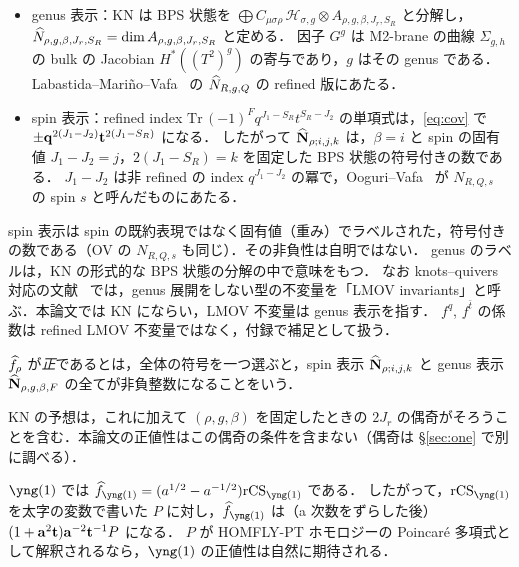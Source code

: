 \begin{itemize}
\item genus 表示：KN は BPS 状態を $\bigoplus C_{\mu\sigma\rho}\,\mathcal{H}_{\sigma,g}\otimes A_{\rho,g,\beta,J_r,S_R}$ と分解し，$\widehat N_{\rho,g,\beta,J_r,S_R}=\dim A_{\rho,g,\beta,J_r,S_R}$ と定める．
因子 $G^g$ は M2-brane の曲線 $\Sigma_{g,h}$ の bulk の Jacobian $H^*((T^2)^g)$ の寄与であり，$g$ はその genus である．
Labastida--Mariño--Vafa~\cite{Labastida01} の $\widehat N_{R,g,Q}$ の refined 版にあたる．
\item spin 表示：refined index $\mathrm{Tr}\,(-1)^Fq^{J_1-S_R}t^{S_R-J_2}$ の単項式は，\eqref{eq:cov} で $\pm\mathbf{q}^{2(J_1-J_2)}\mathbf{t}^{2(J_1-S_R)}$ になる．
したがって $\widehat{\mathbf N}_{\rho;i,j,k}$ は，$\beta=i$ と spin の固有値 $J_1-J_2=j$，$2(J_1-S_R)=k$ を固定した BPS 状態の符号付きの数である．
$J_1-J_2$ は非 refined の index $q^{J_1-J_2}$ の冪で，Ooguri--Vafa~\cite{Ooguri99} が $N_{R,Q,s}$ の spin $s$ と呼んだものにあたる．
\end{itemize}
spin 表示は spin の既約表現ではなく固有値（重み）でラベルされた，符号付きの数である（OV の $N_{R,Q,s}$ も同じ）．その非負性は自明ではない．
genus のラベルは，KN の形式的な BPS 状態の分解の中で意味をもつ．
なお knots--quivers 対応の文献~\cite{Ekholm18} では，genus 展開をしない型の不変量を「LMOV invariants」と呼ぶ．本論文では KN にならい，LMOV 不変量は genus 表示を指す．
$f^q$, $f^{\bar t}$ の係数は refined LMOV 不変量ではなく，付録で補足として扱う．

\begin{definition}[正値性]\label{def:positivity}
$\widehat f_\rho$ が\emph{正}であるとは，全体の符号を一つ選ぶと，spin 表示 $\widehat{\mathbf N}_{\rho;i,j,k}$ と genus 表示 $\widehat{\mathbf N}_{\rho,g,\beta,F}$ の全てが非負整数になることをいう．
\end{definition}
KN の予想は，これに加えて $(\rho,g,\beta)$ を固定したときの $2J_r$ の偶奇がそろうことを含む．本論文の正値性はこの偶奇の条件を含まない（偶奇は \S\ref{sec:one} で別に調べる）．

$\yng(1)$ では $\hf_{\yng(1)}=(a^{1/2}-a^{-1/2})\rCS_{\yng(1)}$ である．
したがって，$\rCS_{\yng(1)}$ を太字の変数で書いた $P$ に対し，$\hf_{\yng(1)}$ は（a 次数をずらした後）$(1+\mathbf{a}^2\mathbf{t})\mathbf{a}^{-2}\mathbf{t}^{-1}P$ になる．
$P$ が HOMFLY-PT ホモロジーの Poincaré 多項式として解釈されるなら，$\yng(1)$ の正値性は自然に期待される．
